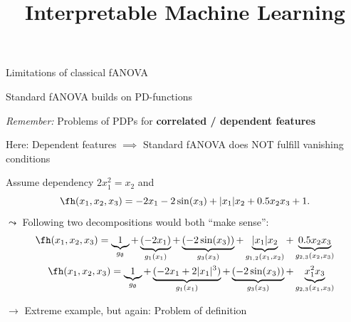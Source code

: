 \documentclass[10pt,compress,t,notes=noshow, xcolor=table]{beamer}
\title{Interpretable Machine Learning}
\begin{document}


\begin{framev}[align=top]{Limitations of classical fANOVA}
\begin{itemizeM}
\item Standard fANOVA builds on PD-functions
\item \textit{Remember:} Problems of PDPs for \textbf{correlated / dependent features}
\item Here: Dependent features $\implies$ Standard fANOVA does NOT fulfill vanishing conditions %
\end{itemizeM}
\pause
\begin{example}
Assume dependency $2x_1^2 = x_2$ and
$$
\fh(x_1, x_2, x_3) = - 2x_1 - 2\sin(x_3) + |x_1|x_2 + 0.5 x_2 x_3 + 1.
$$
$\leadsto$ Following two decompositions would both ``make sense'':
\begin{align*}
\fh(x_1, x_2, x_3)
= \underbrace{1}_{g_\emptyset}
+ \underbrace{(- 2x_1)}_{g_1(x_1)}
+ \underbrace{(- 2\sin(x_3))}_{g_3(x_3)}
+ \underbrace{|x_1|x_2}_{g_{1,2}(x_1, x_2)}
+ \underbrace{0.5 x_2 x_3}_{g_{2,3}(x_2, x_3)} \\
\fh(x_1, x_2, x_3)
= \underbrace{1}_{g_\emptyset}
+ \underbrace{(- 2x_1 + 2 |x_1|^3)}_{g_1(x_1)}
+ \underbrace{(- 2\sin(x_3))}_{g_3(x_3)}
+ \underbrace{x_1^2 x_3}_{g_{2,3}(x_1, x_3)}
\end{align*}
\end{example}
\pause
$\rightarrow$ Extreme example, but again: Problem of definition
\end{framev}
\end{document}
